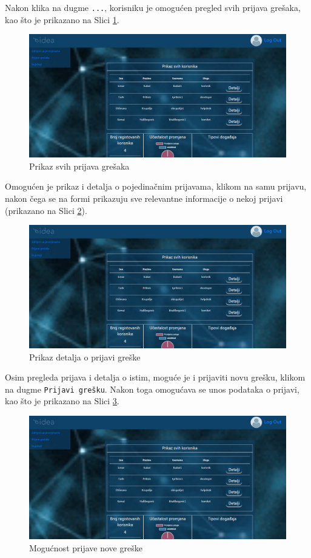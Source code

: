 \documentclass[12pt,a4paper]{article}
\begin{document}
Nakon klika na dugme \texttt{...}, korisniku je omogućen pregled svih prijava grešaka, kao što je prikazano na Slici \ref{s12}.

\begin{figure}[H]
\center
\includegraphics[scale=0.35]{../res/UI/report1.PNG}
\caption{Prikaz svih prijava grešaka}
\label{s12}
\end{figure}

Omogućen je prikaz i detalja o pojedinačnim prijavama, klikom na samu prijavu, nakon čega se na formi prikazuju sve relevantne informacije o nekoj prijavi (prikazano na Slici \ref{s13}).

\begin{figure}[H]
\center
\includegraphics[scale=0.35]{../res/UI/report1.PNG}
\caption{Prikaz detalja o prijavi greške}
\label{s13}
\end{figure}

Osim pregleda prijava i detalja o istim, moguće je i prijaviti novu grešku, klikom na dugme \texttt{Prijavi grešku}. Nakon toga omogućava se unos podataka o prijavi, kao što je prikazano na Slici \ref{s14}.

\begin{figure}[H]
\center
\includegraphics[scale=0.35]{../res/UI/report1.PNG}
\caption{Mogućnost prijave nove greške}
\label{s14}
\end{figure}
\end{document}
